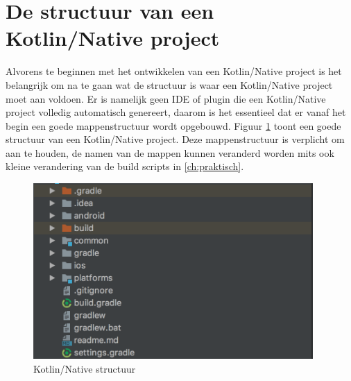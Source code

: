 \section{De structuur van een Kotlin/Native project}
\label{sec:knstructure}
Alvorens te beginnen met het ontwikkelen van een Kotlin/Native project is het belangrijk om na te gaan wat de structuur is waar een Kotlin/Native project moet aan voldoen. Er is namelijk geen IDE of plugin die een Kotlin/Native project volledig automatisch genereert, daarom is het essentieel dat er vanaf het begin een goede mappenstructuur wordt opgebouwd. Figuur \ref{fig:knstructuur} toont een goede structuur van een Kotlin/Native project. Deze mappenstructuur is verplicht om aan te houden, de namen van de mappen kunnen veranderd worden mits ook kleine verandering van de build scripts in \ref{ch:praktisch}.

\begin{figure} [ht]
	\centering
	\includegraphics[width=0.95\textwidth]{img/kn-project-structure}
	\caption{Kotlin/Native structuur}
	\label{fig:knstructuur}
\end{figure}


